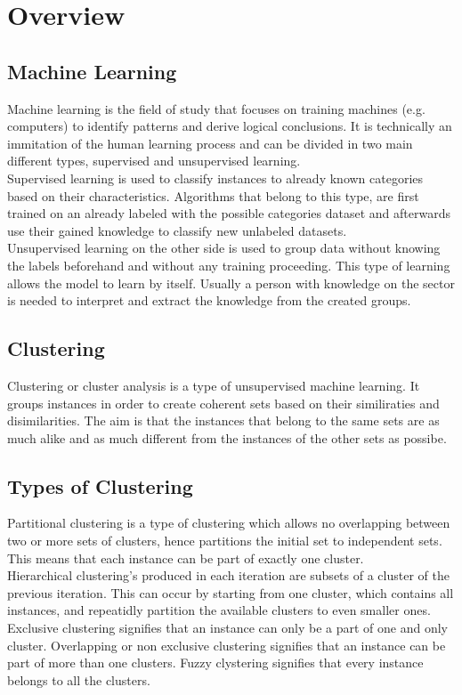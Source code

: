 \section{Overview}

\subsection{Machine Learning}
Machine learning is the field of study that focuses on training machines (e.g. computers) to identify patterns and derive logical conclusions. It is technically an immitation of the human learning process and can be divided in two main different types, supervised and unsupervised learning. \autocite{machDef} \\
Supervised learning is used to classify instances to already known categories based on their characteristics. Algorithms that belong to this type, are first trained on an already labeled with the possible categories dataset and afterwards use their gained knowledge to classify new unlabeled datasets. \\
Unsupervised learning on the other side is used to group data without knowing the labels beforehand and without any training proceeding. This type of learning allows the model to learn by itself. Usually a person with knowledge on the sector is needed to interpret and extract the knowledge from the created groups. \\

\subsection{Clustering}
Clustering or cluster analysis is a type of unsupervised machine learning. It groups instances in order to create coherent sets based on their similiraties and disimilarities. The aim is that the instances that belong to the same sets are as much alike and as much different from the instances of the other sets  as possibe.

\subsection{Types of Clustering}
Partitional clustering is a type of clustering which allows no overlapping between two or more sets of clusters, hence partitions the initial set to independent sets. This means that each instance can be part of exactly one cluster. \\
Hierarchical clustering's produced in each iteration are subsets of a cluster of the previous iteration. This can occur by starting from one cluster, which contains all instances, and repeatidly partition the available clusters to even smaller ones. \\
Exclusive clustering signifies that an instance can only be a part of one and only cluster.
Overlapping or non exclusive clustering signifies that an instance can be part of more than one clusters.
Fuzzy clystering signifies that every instance belongs to all the clusters.  \autocite{tanSteinKum}
  
